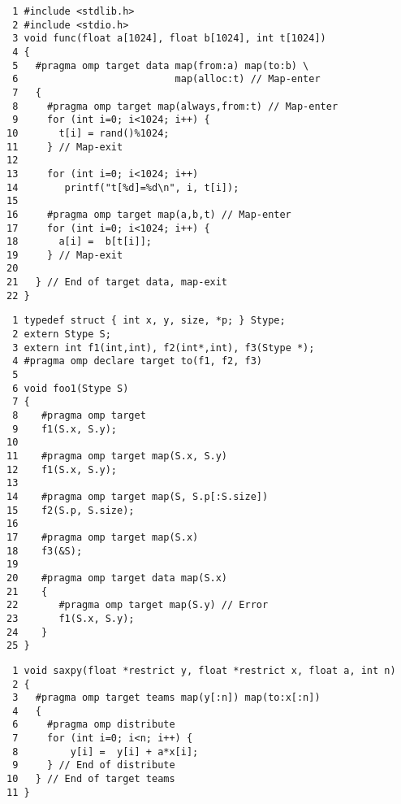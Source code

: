 \begin{figure*}[!tb]
\begin{verbatim}
 1 #include <stdlib.h>
 2 #include <stdio.h>
 3 void func(float a[1024], float b[1024], int t[1024])
 4 {
 5   #pragma omp target data map(from:a) map(to:b) \
 6                           map(alloc:t) // Map-enter
 7   {
 8     #pragma omp target map(always,from:t) // Map-enter
 9     for (int i=0; i<1024; i++) {
10       t[i] = rand()%1024;
11     } // Map-exit
12 
13     for (int i=0; i<1024; i++)
14        printf("t[%d]=%d\n", i, t[i]);
15 
16     #pragma omp target map(a,b,t) // Map-enter
17     for (int i=0; i<1024; i++) {
18       a[i] =  b[t[i]];
19     } // Map-exit
20 
21   } // End of target data, map-exit
22 }
\end{verbatim}
\caption{ \textbf {Example of a variable appearing in nested map clauses} -- \small
          There is only one instance of a variable in an accelerator's
          address space.
         }
\label{figure:chapter6-map-v3}
\end{figure*}


\begin{figure*}[!tb]
\begin{verbatim}
 1 typedef struct { int x, y, size, *p; } Stype;
 2 extern Stype S;
 3 extern int f1(int,int), f2(int*,int), f3(Stype *);
 4 #pragma omp declare target to(f1, f2, f3) 
 5 
 6 void foo1(Stype S)
 7 {
 8    #pragma omp target
 9    f1(S.x, S.y);
10 
11    #pragma omp target map(S.x, S.y)
12    f1(S.x, S.y);
13 
14    #pragma omp target map(S, S.p[:S.size])
15    f2(S.p, S.size);
16 
17    #pragma omp target map(S.x)
18    f3(&S);
19 
20    #pragma omp target data map(S.x)
21    {
22       #pragma omp target map(S.y) // Error
23       f1(S.x, S.y);
24    }
25 }
\end{verbatim}
\caption{ \textbf {Example of mapping structure members} -- \small
          Structure members may appear in map clauses and array sections with some
          restrictions.
         }
\label{figure:chapter6-mapstruct}
\end{figure*}


\begin{figure*}[!tb]
\begin{verbatim}
 1 void saxpy(float *restrict y, float *restrict x, float a, int n)
 2 {
 3   #pragma omp target teams map(y[:n]) map(to:x[:n]) 
 4   {
 6     #pragma omp distribute 
 7     for (int i=0; i<n; i++) {
 8         y[i] =  y[i] + a*x[i];
 9     } // End of distribute
10   } // End of target teams
11 }
\end{verbatim}
\caption{ \textbf {Example of default data-mapping attribute rules} -- \small
          The pointer variables \texttt{x} and \texttt{y} are \texttt{private}. The 
          scalar variables \texttt{a} and \texttt{n} are \texttt{firstprivate}.
         }
\label{figure:chapter6-defaultmap-v1}
\end{figure*}


